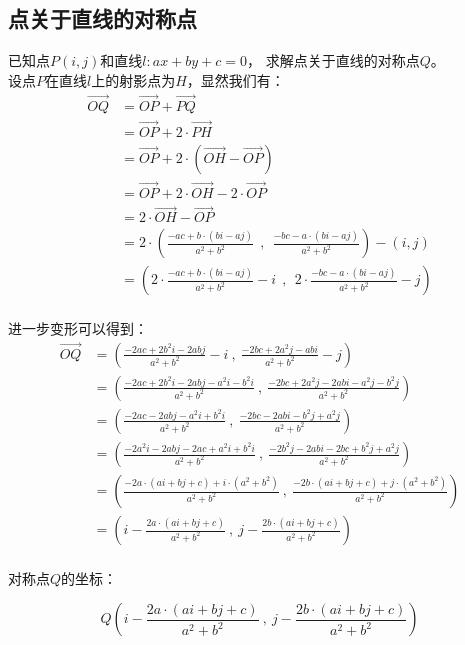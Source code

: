 \documentclass[UTF8]{ctexart}
\begin{document}
\newpage

\subsection{点关于直线的对称点}
    已知点$P(i,j)$和直线$l:ax+by+c=0$，
    求解点关于直线的对称点$Q$。\\[3mm]
    设点$P$在直线$l$上的射影点为$H$，显然我们有：
    \setcounter{equation}{0}
    \begin{align}
        \overrightarrow{OQ}
        &=\overrightarrow{OP}+\overrightarrow{PQ}\\[3mm]
        &=\overrightarrow{OP}+2\cdot\overrightarrow{PH}\\[3mm]
        &=\overrightarrow{OP}+2\cdot\left(\overrightarrow{OH}-\overrightarrow{OP}\right)\\[3mm]
        &=\overrightarrow{OP}+2\cdot\overrightarrow{OH}-2\cdot\overrightarrow{OP}\\[3mm]
        &=2\cdot\overrightarrow{OH}-\overrightarrow{OP}\\[3mm]
        &=2\cdot\left(\frac{-ac+b\cdot(bi-aj)}{a^2+b^2}~~,~~\frac{-bc-a\cdot(bi-aj)}{a^2+b^2}\right)-(i,j)\\[3mm]
        &=\left(2\cdot\frac{-ac+b\cdot(bi-aj)}{a^2+b^2}-i~~,~~2\cdot\frac{-bc-a\cdot(bi-aj)}{a^2+b^2}-j\right)
    \end{align}\\
    进一步变形可以得到：
    \begin{align}
        \overrightarrow{OQ}
        &=\left(\frac{-2ac+2b^2i-2abj}{a^2+b^2}-i~,~\frac{-2bc+2a^2j-abi}{a^2+b^2}-j\right)\\[3mm]
        &=\left(\frac{-2ac+2b^2i-2abj-a^2i-b^2i}{a^2+b^2}~,~\frac{-2bc+2a^2j-2abi-a^2j-b^2j}{a^2+b^2}\right)\\[3mm]
        &=\left(\frac{-2ac-2abj-a^2i+b^2i}{a^2+b^2}~,~\frac{-2bc-2abi-b^2j+a^2j}{a^2+b^2}\right)\\[3mm]
        &=\left(\frac{-2a^2i-2abj-2ac+a^2i+b^2i}{a^2+b^2}~,~\frac{-2b^2j-2abi-2bc+b^2j+a^2j}{a^2+b^2}\right)\\[3mm]
        &=\left(\frac{-2a\cdot(ai+bj+c)+i\cdot\left(a^2+b^2\right)}{a^2+b^2}~,~\frac{-2b\cdot(ai+bj+c)+j\cdot\left(a^2+b^2\right)}{a^2+b^2}\right)\\[3mm]
        &=\left(i-\frac{2a\cdot(ai+bj+c)}{a^2+b^2}~,~j-\frac{2b\cdot(ai+bj+c)}{a^2+b^2}\right)
    \end{align}\\
    对称点$Q$的坐标：\vspace{5pt}
    \begin{large}
        \begin{equation*}
            Q\left(i-\frac{2a\cdot(ai+bj+c)}{a^2+b^2}~,~j-\frac{2b\cdot(ai+bj+c)}{a^2+b^2}\right)
        \end{equation*}
    \end{large}
\end{document}
